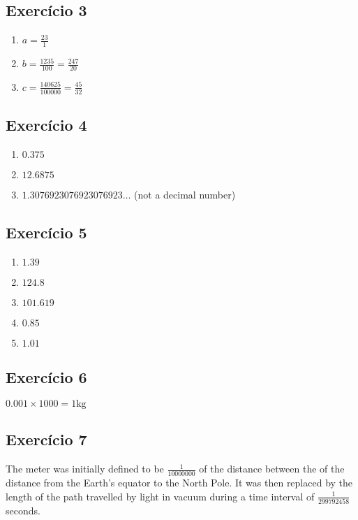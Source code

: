 \subsection*{Exercício 3}

\begin{enumerate}
\item $a = \frac{23}{1}$
\item $b = \frac{1235}{100}=\frac{247}{20}$
\item $c = \frac{140625}{100000} = \frac{45}{32}$
\end{enumerate}

\subsection*{Exercício 4}

\begin{enumerate}
\item $0.375$
\item $12.6875$
\item $1.3076923076923076923\ldots$ (not a decimal number)
\end{enumerate}

\subsection*{Exercício 5}

\begin{enumerate}
\item $1.39$
\item $124.8$
\item $101.619$
\item $0.85$
\item $1.01$
\end{enumerate}

\subsection*{Exercício 6}

$0.001 \times 1000 = 1 \text{kg}$

\subsection*{Exercício 7}

The meter was initially defined to be $\frac{1}{10000000}$ of the distance
between the of the distance from the Earth's equator to the North Pole.
It was then replaced by the length of the path travelled by light in vacuum
during a time interval of $\frac{1}{299792458}$ seconds.


